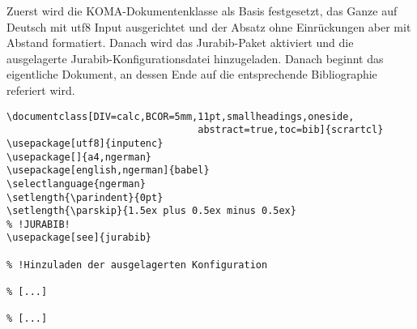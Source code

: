 Zuerst wird die KOMA-Dokumentenklasse als Basis festgesetzt, das Ganze auf
Deutsch mit utf8 Input ausgerichtet und der Absatz ohne Einrückungen aber mit
Abstand formatiert. Danach wird das Jurabib-Paket aktiviert und die ausgelagerte
Jurabib-Konfigurationsdatei hinzugeladen. Danach beginnt das eigentliche
Dokument, an dessen Ende auf die entsprechende Bibliographie referiert wird.
\small
\begin{verbatim}
\documentclass[DIV=calc,BCOR=5mm,11pt,smallheadings,oneside,
                                 abstract=true,toc=bib]{scrartcl}
\usepackage[utf8]{inputenc}
\usepackage[]{a4,ngerman}
\usepackage[english,ngerman]{babel}
\selectlanguage{ngerman}
\setlength{\parindent}{0pt}
\setlength{\parskip}{1.5ex plus 0.5ex minus 0.5ex}
% !JURABIB!
\usepackage[see]{jurabib}

% !Hinzuladen der ausgelagerten Konfiguration

% [...]

% [...]



\end{verbatim}

